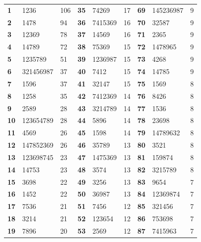{{  	%
	  \begin{table}[H]
	    \centering
	    \begin{tabular}{l | l l | l | l l  | l | l l }
	      \hline
	      {\bf 1}  & 1236       & 106 & {\bf 35} & 74269    & 17 & {\bf 69} & 145236987 & 9 \\
	      {\bf 2}  & 1478       & 94  & {\bf 36} & 7415369  & 16 & {\bf 70} & 32587 & 9 \\ 
	      {\bf 3}  & 12369      & 78  & {\bf 37} & 14569    & 16 & {\bf 71} & 2365 & 9 \\ 
	      {\bf 4}  & 14789      & 72  & {\bf 38} & 75369    & 15 & {\bf 72} & 1478965 & 9 \\ 
	      {\bf 5}  & 1235789    & 51  & {\bf 39} & 1236987  & 15 & {\bf 73} & 4268 & 9 \\ 
	      {\bf 6}  & 321456987  & 37  & {\bf 40} & 7412     & 15 & {\bf 74} & 14785 & 9 \\  
	      {\bf 7}  & 1596       & 37  & {\bf 41} & 32147    & 15 & {\bf 75} & 1569 & 8 \\ 
	      {\bf 8}  & 1258       & 35  & {\bf 42} & 7412369  & 14 & {\bf 76} & 8426 & 8 \\ 
	      {\bf 9}  & 2589       & 28  & {\bf 43} & 3214789  & 14 & {\bf 77} & 1536 & 8 \\ 
	      {\bf 10} & 123654789  & 28  & {\bf 44} & 5896     & 14 & {\bf 78} & 23698 & 8 \\ 
	      {\bf 11} & 4569       & 26  & {\bf 45} & 1598     & 14 & {\bf 79} & 14789632 & 8 \\ 
	      {\bf 12} & 147852369  & 26  & {\bf 46} & 35789    & 13 & {\bf 80} & 3521 & 8 \\ 
	      {\bf 13} & 123698745  & 23  & {\bf 47} & 1475369  & 13 & {\bf 81} & 159874 & 8 \\ 
	      {\bf 14} & 14753      & 23  & {\bf 48} & 3574     & 13 & {\bf 82} & 3215789 & 8 \\ 
	      {\bf 15} & 3698       & 22  & {\bf 49} & 3256     & 13 & {\bf 83} & 9654 & 7 \\ 
	      {\bf 16} & 1452       & 22  & {\bf 50} & 36987    & 13 & {\bf 84} & 12369874 & 7 \\ 
	      {\bf 17} & 7536       & 21  & {\bf 51} & 7456     & 12 & {\bf 85} & 321456 & 7 \\ 
	      {\bf 18} & 3214       & 21  & {\bf 52} & 123654   & 12 & {\bf 86} & 753698 & 7 \\ 
	      {\bf 19} & 7896       & 20  & {\bf 53} & 2569     & 12 & {\bf 87} & 7415963 & 7 \\ 

\end{tabular}
\end{table}}}
